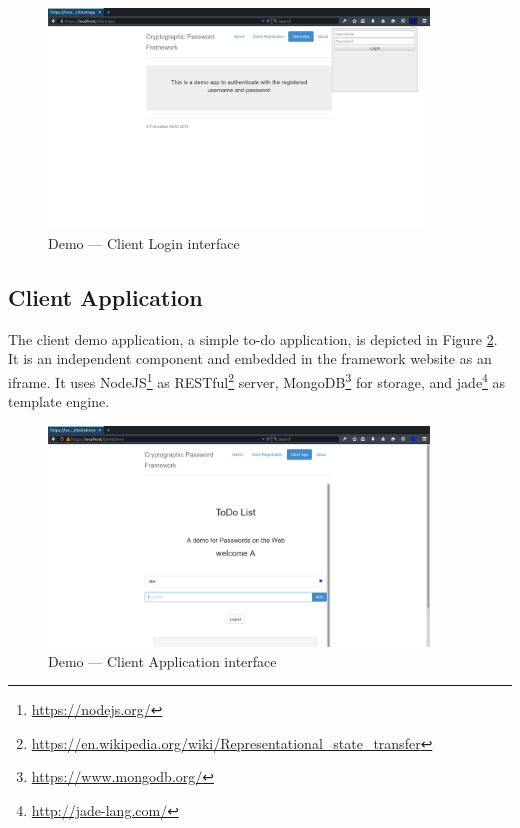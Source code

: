 \begin{figure}[tbph]
\centering
\includegraphics[width=0.9\textwidth]{Figs/demo-login-popup.png}
\caption{Demo --- Client Login interface}\label{fig:demo-login}
\end{figure}

\subsection{Client Application}
The client demo application, a simple to-do application, is depicted in Figure \ref{fig:demo-app}.
It is an independent component and embedded in the framework website as an iframe.
It uses NodeJS\footnote{\url{https://nodejs.org/}} as RESTful\footnote{\url{https://en.wikipedia.org/wiki/Representational_state_transfer}} server, MongoDB\footnote{\url{https://www.mongodb.org/}} for storage, and jade\footnote{\url{http://jade-lang.com/}} as template engine.

\begin{figure}[tbph]
\centering
\includegraphics[width=0.9\textwidth]{Figs/demo-app.png}
\caption{Demo --- Client Application interface}\label{fig:demo-app}
\end{figure}
